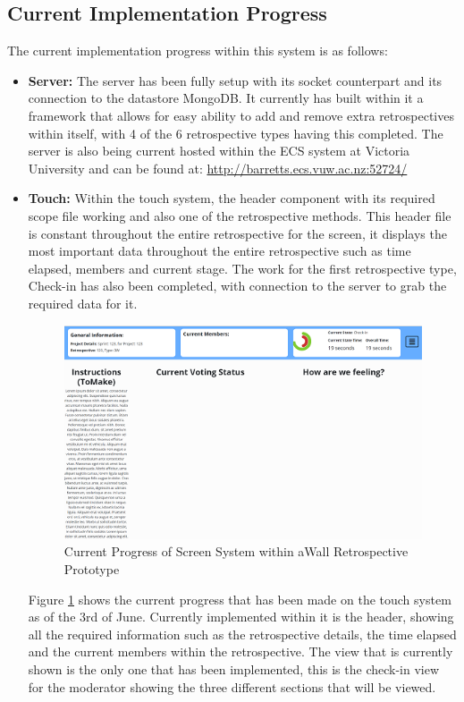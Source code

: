 \documentclass[11pt
              , a4paper
              , twoside
              , openright
              ]{report}
\begin{document}
\subsection{Current Implementation Progress}
The current implementation progress within this system is as follows:
\begin{itemize}
	\item \textbf{Server:} The server has been fully setup with its socket counterpart and its connection to the datastore MongoDB. It currently has built within it a framework that allows for easy ability to add and remove extra retrospectives within itself, with 4 of the 6 retrospective types having this completed. The server is also being current hosted within the ECS system at Victoria University and can be found at: \url{http://barretts.ecs.vuw.ac.nz:52724/}
	\item \textbf{Touch:} Within the touch system, the header component with its required scope file working and also one of the retrospective methods. This header file is constant throughout the entire retrospective for the screen, it displays the most important data throughout the entire retrospective such as time elapsed, members and current stage. The work for the first retrospective type, Check-in has also been completed, with connection to the server to grab the required data for it. 
	\begin{figure}[ht]
		\centering
		\includegraphics{moderator_progress}
		\caption{Current Progress of Screen System within aWall Retrospective Prototype} \label{fig:modProgress}
	\end{figure}

	Figure \ref{fig:modProgress} shows the current progress that has been made on the touch system as of the 3rd of June. Currently implemented within it is the header, showing all the required information such as the retrospective details, the time elapsed and the current members within the retrospective. The view that is currently shown is the only one that has been implemented, this is the check-in view for the moderator showing the three different sections that will be viewed.
	

\end{itemize}
\end{document}
